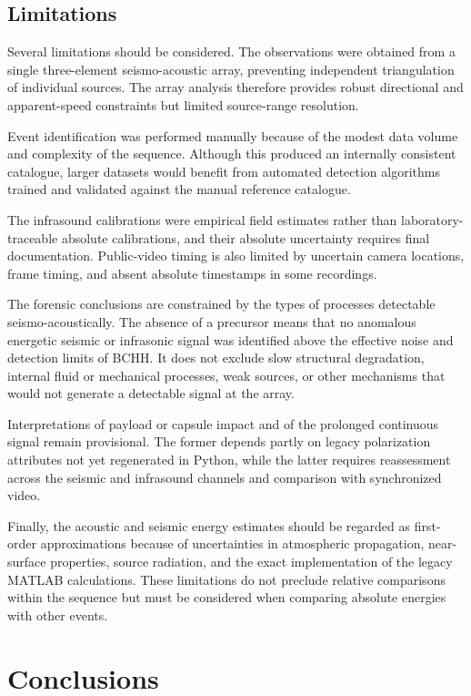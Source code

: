 \documentclass[]{seismica}
\begin{document}
\subsection{Limitations}
\label{sec:discussion_limitations}

Several limitations should be considered. The observations were obtained from a single three-element seismo-acoustic array, preventing independent triangulation of individual sources. The array analysis therefore provides robust directional and apparent-speed constraints but limited source-range resolution.

Event identification was performed manually because of the modest data volume and complexity of the sequence. Although this produced an internally consistent catalogue, larger datasets would benefit from automated detection algorithms trained and validated against the manual reference catalogue.

The infrasound calibrations were empirical field estimates rather than
laboratory-traceable absolute calibrations, and their absolute uncertainty
requires final documentation. Public-video timing is also limited by uncertain
camera locations, frame timing, and absent absolute timestamps in some
recordings.

The forensic conclusions are constrained by the types of processes detectable
seismo-acoustically. The absence of a precursor means that no anomalous
energetic seismic or infrasonic signal was identified above the effective noise
and detection limits of BCHH. It does not exclude slow structural degradation,
internal fluid or mechanical processes, weak sources, or other mechanisms that
would not generate a detectable signal at the array.

Interpretations of payload or capsule impact and of the prolonged continuous
signal remain provisional. The former depends partly on legacy polarization
attributes not yet regenerated in Python, while the latter requires
reassessment across the seismic and infrasound channels and comparison with
synchronized video.

Finally, the acoustic and seismic energy estimates should be regarded as
first-order approximations because of uncertainties in atmospheric propagation,
near-surface properties, source radiation, and the exact implementation of the
legacy MATLAB calculations. These limitations do not preclude relative
comparisons within the sequence but must be considered when comparing absolute
energies with other events.

\section{Conclusions}
\label{sec:conclusions}
\end{document}
